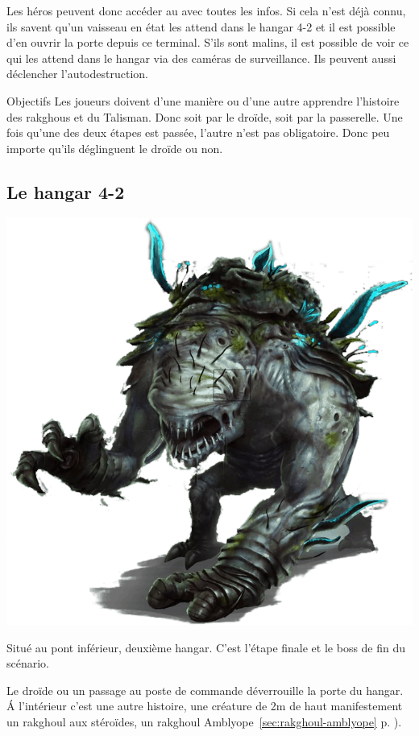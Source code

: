 Les héros peuvent donc accéder au  avec toutes les infos. Si cela n’est déjà connu, ils savent qu’un vaisseau en état les attend dans le hangar 4-2 et il est possible d’en ouvrir la porte depuis ce terminal. S’ils sont malins, il est possible de voir ce qui les attend dans le hangar via des caméras de surveillance. Ils peuvent aussi déclencher l’autodestruction.

\begin{paperbox}{Objectifs}
Les joueurs doivent d’une manière ou d’une autre apprendre l’histoire des rakghous et du Talisman. Donc soit par le droïde, soit par la passerelle. Une fois qu’une des deux étapes est passée, l’autre n’est pas obligatoire. Donc peu importe qu’ils déglinguent le droïde ou non.
\end{paperbox}

\subsection{Le hangar 4-2}

\noindent\includegraphics[width=\linewidth]{_img/dos-au-muur/rakghoul-amblyope.png}

Situé au pont inférieur, deuxième hangar. C’est l’étape finale et le boss de fin du scénario.

Le droïde ou un passage au poste de commande déverrouille la porte du hangar. \'A l’intérieur c’est une autre histoire, une créature de 2m de haut manifestement un rakghoul aux stéroïdes, un rakghoul Amblyope~\ref{sec:rakghoul-amblyope} p. \pageref{sec:rakghoul-amblyope}).

